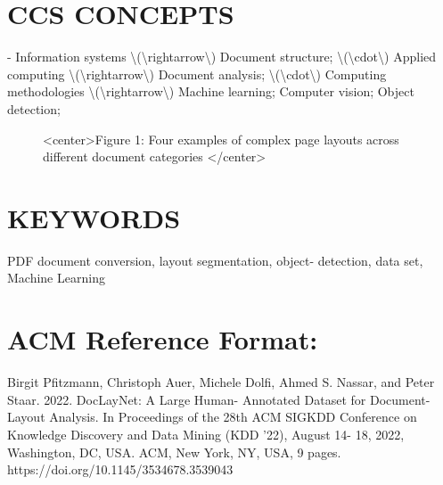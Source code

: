 \documentclass[11pt,a4paper]{article}
\begin{document}
\section{CCS CONCEPTS}

- Information systems \textbackslash{}(\textbackslash{}rightarrow\textbackslash{}) Document structure; \textbackslash{}(\textbackslash{}cdot\textbackslash{}) Applied computing \textbackslash{}(\textbackslash{}rightarrow\textbackslash{}) Document analysis; \textbackslash{}(\textbackslash{}cdot\textbackslash{}) Computing methodologies \textbackslash{}(\textbackslash{}rightarrow\textbackslash{}) Machine learning; Computer vision; Object detection;

\begin{figure}[h]
\caption{<center>Figure 1: Four examples of complex page layouts across different document categories </center>}
\end{figure}

\section{KEYWORDS}

PDF document conversion, layout segmentation, object- detection, data set, Machine Learning

\section{ACM Reference Format:}

Birgit Pfitzmann, Christoph Auer, Michele Dolfi, Ahmed S. Nassar, and Peter Staar. 2022. DocLayNet: A Large Human- Annotated Dataset for Document- Layout Analysis. In Proceedings of the 28th ACM SIGKDD Conference on Knowledge Discovery and Data Mining (KDD '22), August 14- 18, 2022, Washington, DC, USA. ACM, New York, NY, USA, 9 pages. https://doi.org/10.1145/3534678.3539043
\end{document}
